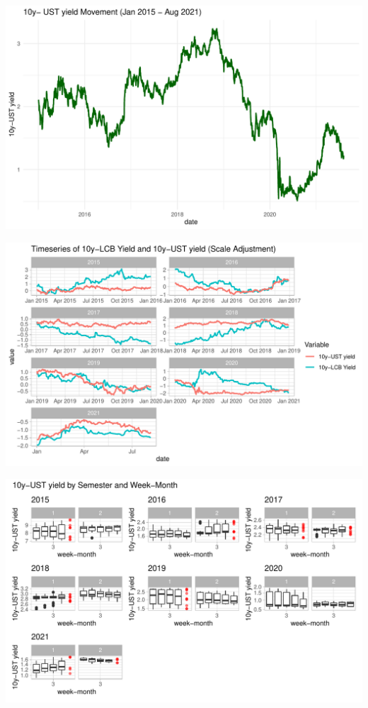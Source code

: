\documentclass[11pt,a4paper,]{article}
\begin{document}
\includegraphics{Untitled_files/figure-latex/unnamed-chunk-5-1.pdf}

\includegraphics{Untitled_files/figure-latex/unnamed-chunk-6-1.pdf}

\includegraphics{Untitled_files/figure-latex/unnamed-chunk-7-1.pdf}
\end{document}
